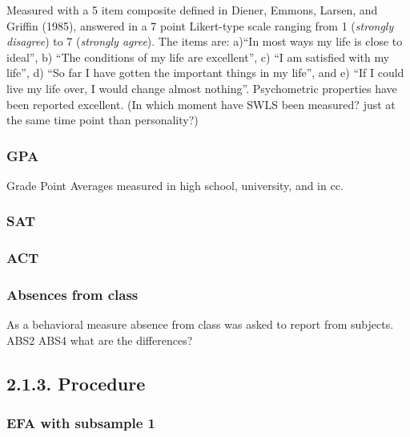 \documentclass[,man,floatsintext]{apa6}
\theoremstyle{definition}
\theoremstyle{definition}
\theoremstyle{definition}
\theoremstyle{remark}
\begin{document}
Measured with a 5 item composite defined in Diener, Emmons, Larsen, and
Griffin (1985), answered in a 7 point Likert-type scale ranging from 1
(\emph{strongly disagree}) to 7 (\emph{strongly agree}). The items are:
a)\enquote{In most ways my life is close to ideal}, b) \enquote{The
conditions of my life are excellent}, c) \enquote{I am satisfied with my
life}, d) \enquote{So far I have gotten the important things in my
life}, and e) \enquote{If I could live my life over, I would change
almost nothing}. Psychometric properties have been reported excellent.
(In which moment have SWLS been measured? just at the same time point
than personality?)

\hypertarget{gpa}{%
\subsubsection{GPA}\label{gpa}}

Grade Point Averages measured in high school, university, and in cc.

\hypertarget{sat}{%
\subsubsection{SAT}\label{sat}}

\hypertarget{act}{%
\subsubsection{ACT}\label{act}}

\hypertarget{absences-from-class}{%
\subsubsection{Absences from class}\label{absences-from-class}}

As a behavioral measure absence from class was asked to report from
subjects. ABS2 ABS4 what are the differences?

\hypertarget{procedure}{%
\subsection{2.1.3. Procedure}\label{procedure}}

\hypertarget{efa-with-subsample-1}{%
\subsubsection{EFA with subsample 1}\label{efa-with-subsample-1}}
\end{document}

